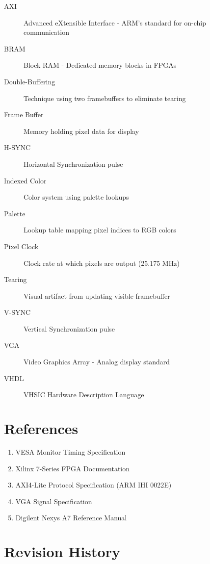 \documentclass[11pt,letterpaper]{report}
\begin{document}
\begin{description}
    \item[AXI] Advanced eXtensible Interface - ARM's standard for on-chip communication
    \item[BRAM] Block RAM - Dedicated memory blocks in FPGAs
    \item[Double-Buffering] Technique using two framebuffers to eliminate tearing
    \item[Frame Buffer] Memory holding pixel data for display
    \item[H-SYNC] Horizontal Synchronization pulse
    \item[Indexed Color] Color system using palette lookups
    \item[Palette] Lookup table mapping pixel indices to RGB colors
    \item[Pixel Clock] Clock rate at which pixels are output (25.175 MHz)
    \item[Tearing] Visual artifact from updating visible framebuffer
    \item[V-SYNC] Vertical Synchronization pulse
    \item[VGA] Video Graphics Array - Analog display standard
    \item[VHDL] VHSIC Hardware Description Language
\end{description}

\section{References}

\begin{enumerate}
    \item VESA Monitor Timing Specification
    \item Xilinx 7-Series FPGA Documentation
    \item AXI4-Lite Protocol Specification (ARM IHI 0022E)
    \item VGA Signal Specification
    \item Digilent Nexys A7 Reference Manual
\end{enumerate}

\section{Revision History}
\end{document}
